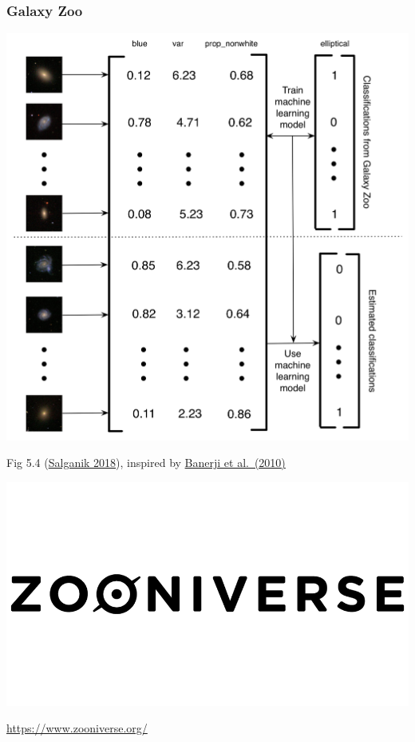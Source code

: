\documentclass[aspectratio=169]{beamer}
\begin{document}
\begin{frame}
\frametitle{Galaxy Zoo}

\begin{center}
\includegraphics[height=0.8\textheight]{figures/bitbybit5-4_gz_banerji_schematic}
\end{center}

\vfill
Fig 5.4 (\href{https://www.bitbybitbook.com/}{Salganik 2018}), inspired by \href{https://doi.org/10.1111/j.1365-2966.2010.16713.x}{Banerji et al.\ (2010)}
\end{frame}
\begin{frame}

\begin{center}
\includegraphics[width=\textwidth]{figures/zooniverse_logo}
\end{center}

\vfill
\url{https://www.zooniverse.org/}
\end{frame}
\end{document}

